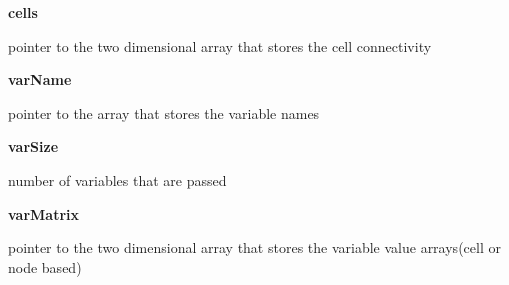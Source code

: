 \documentclass{article}
\begin{document}
        {\bf cells} \par pointer to the two dimensional array that stores the cell connectivity
\medskip
        
        {\bf varName} \par pointer to the array that stores the variable names
\medskip
        
        {\bf varSize} \par number of variables that are passed 
\medskip
        
        {\bf varMatrix} \par pointer to the two dimensional array that stores the variable value arrays(cell or node based) 

        


%
%
\end{document}
